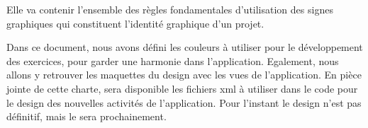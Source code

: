 Elle va contenir l'ensemble des règles fondamentales d'utilisation des signes graphiques qui constituent l'identité graphique d'un projet.


Dans ce document, nous avons défini les couleurs à utiliser pour le développement des exercices, pour garder une harmonie dans l'application. Egalement, nous allons y retrouver les maquettes du design avec les vues de l'application. En pièce jointe de cette charte, sera disponible les fichiers xml à utiliser dans le code pour le design des nouvelles activités de l'application. Pour l'instant le design n'est pas définitif, mais le sera prochainement.